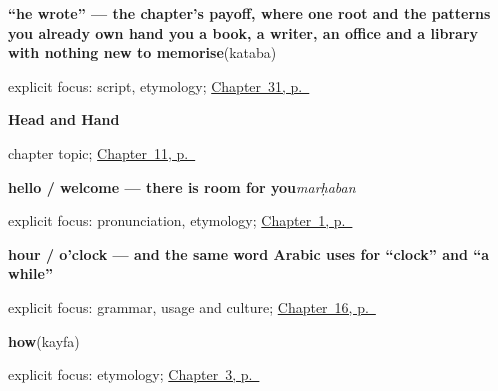 \noindent\begin{minipage}[t]{\linewidth}
\raggedright
\textbf{\textquotedblleft{}he wrote\textquotedblright{} — the chapter's payoff, where one root and the patterns you already own hand you a book, a writer, an office and a library with nothing new to memorise}\enspace\emph{}\enspace(kataba)\par
\footnotesize explicit focus: script, etymology; \hyperref[ch:ar-understanding-reading-writing]{Chapter~31, p.~\pageref*{ch:ar-understanding-reading-writing}}
\end{minipage}\par\smallskip

\noindent\begin{minipage}[t]{\linewidth}
\raggedright
\textbf{Head and Hand}\par
\footnotesize chapter topic; \hyperref[ch:ar-head-and-hand]{Chapter~11, p.~\pageref*{ch:ar-head-and-hand}}
\end{minipage}\par\smallskip

\noindent\begin{minipage}[t]{\linewidth}
\raggedright
\textbf{hello / welcome — there is room for you}\enspace\emph{marḥaban}\par
\footnotesize explicit focus: pronunciation, etymology; \hyperref[ch:greetings]{Chapter~1, p.~\pageref*{ch:greetings}}
\end{minipage}\par\smallskip

\noindent\begin{minipage}[t]{\linewidth}
\raggedright
\textbf{hour / o'clock — and the same word Arabic uses for \textquotedblleft{}clock\textquotedblright{} and \textquotedblleft{}a while\textquotedblright{}}\enspace\emph{}\par
\footnotesize explicit focus: grammar, usage and culture; \hyperref[ch:ar-telling-time]{Chapter~16, p.~\pageref*{ch:ar-telling-time}}
\end{minipage}\par\smallskip

\noindent\begin{minipage}[t]{\linewidth}
\raggedright
\textbf{how}\enspace\emph{}\enspace(kayfa)\par
\footnotesize explicit focus: etymology; \hyperref[ch:ar-how-are-you]{Chapter~3, p.~\pageref*{ch:ar-how-are-you}}
\end{minipage}\par\smallskip

